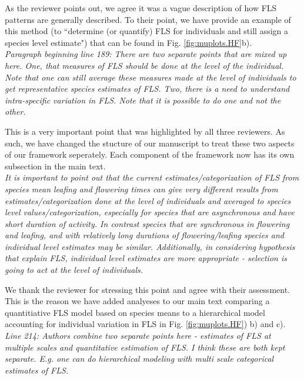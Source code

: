 \documentclass{article}[11pt]
\begin{document}
{\noindent As the reviewer points out, we agree it was a vague description of how FLS patterns are generally described. To their point, we have provide an example of this method (to ``determine (or quantify) FLS for individuals and still assign a species level estimate") that can be found in Fig. \ref{fig:muplots.HF}b).\\


\emph{Paragraph beginning line 189: There are two separate points that are mixed up here. One, that measures of FLS should be done at the level of the individual. Note that one can still average these measures made at the level of individuals to get representative species estimates of FLS. Two, there is a need to understand intra-specific variation in FLS. Note that it is possible to do one and not the other.}
 
\noindent This is a very important point that was highlighted by all three reviewers. As such, we have changed the stucture of our manuscript to treat these two aspects of our framework seperately. Each component of the framework now has its own subsection in the main text.\\

\emph{It is important to point out that the current estimates/categorization of FLS from species mean leafing and flowering times can give very different results from estimates/categorization done at the level of individuals and averaged to species level values/categorization, especially for species that are asynchronous and have short duration of activity. In contrast species that are synchronous in flowering and leafing, and with relatively long durations of flowering/leafing species and individual level estimates may be similar. Additionally, in considering hypothesis that explain FLS, individual level estimates are more appropriate - selection is going to act at the level of individuals.}

\noindent We thank the reviewer for stressing this point and agree with their assessment. This is the reason we have added analyeses to our main text comparing a quantitiative FLS model based on species means to a hierarchical model accounting for individual variation in FLS in Fig.  \ref{fig:muplots.HF}) b) and c).\\

\emph{Line 214: Authors combine two separate points here - estimates of FLS at multiple scales and quantitative estimation of FLS. I think these are both kept separate. E.g. one can do hierarchical modeling with  multi scale categorical estimates of FLS.}\\

}
\end{document}
